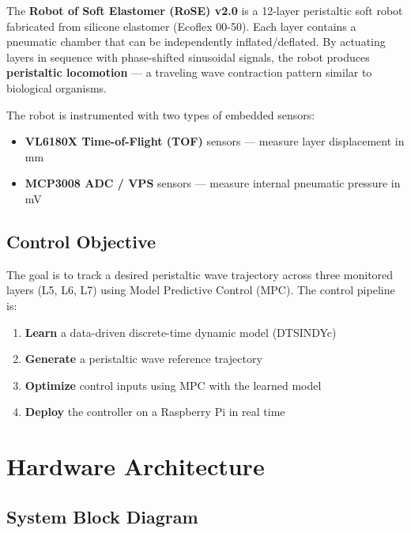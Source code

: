 \documentclass[11pt,a4paper]{article}
\begin{document}
\begin{conceptbox}
The \textbf{Robot of Soft Elastomer (RoSE) v2.0} is a 12-layer peristaltic soft robot
fabricated from silicone elastomer (Ecoflex 00-50). Each layer contains a pneumatic
chamber that can be independently inflated/deflated. By actuating layers in sequence
with phase-shifted sinusoidal signals, the robot produces \textbf{peristaltic locomotion}
--- a traveling wave contraction pattern similar to biological organisms.

The robot is instrumented with two types of embedded sensors:
\begin{itemize}[leftmargin=1.5cm]
    \item[\textcolor{roseblue}{\textbullet}] \textbf{VL6180X Time-of-Flight (TOF)} sensors --- measure layer displacement in mm
    \item[\textcolor{rosepink}{\textbullet}] \textbf{MCP3008 ADC / VPS} sensors --- measure internal pneumatic pressure in mV
\end{itemize}
\end{conceptbox}

\subsection{Control Objective}
The goal is to track a desired peristaltic wave trajectory across three monitored
layers (L5, L6, L7) using Model Predictive Control (MPC). The control pipeline is:

\begin{enumerate}
    \item \textbf{Learn} a data-driven discrete-time dynamic model (DTSINDYc)
    \item \textbf{Generate} a peristaltic wave reference trajectory
    \item \textbf{Optimize} control inputs using MPC with the learned model
    \item \textbf{Deploy} the controller on a Raspberry Pi in real time
\end{enumerate}

\section{Hardware Architecture}
\label{sec:hardware}

\subsection{System Block Diagram}
\end{document}
